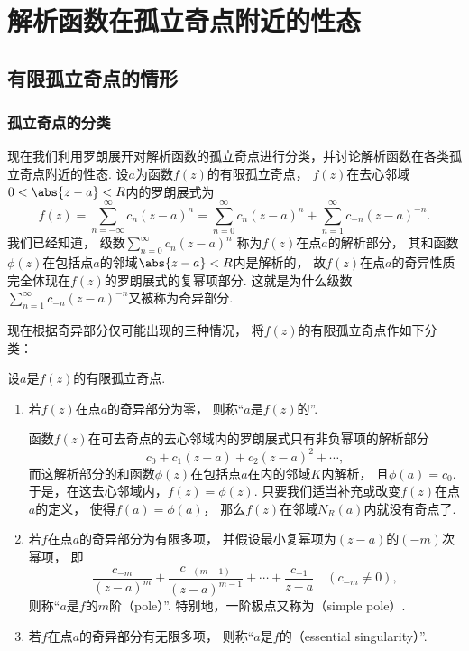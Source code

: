 \section{解析函数在孤立奇点附近的性态}
\subsection{有限孤立奇点的情形}
\subsubsection{孤立奇点的分类}
现在我们利用罗朗展开对解析函数的孤立奇点进行分类，并讨论解析函数在各类孤立奇点附近的性态.
设\(a\)为函数\(f(z)\)的有限孤立奇点，
\(f(z)\)在去心邻域\(0<\abs{z-a}<R\)内的罗朗展式为\[
	f(z) = \sum_{n=-\infty}^\infty c_n (z-a)^n
	= \sum_{n=0}^\infty c_n (z-a)^n
	+ \sum_{n=1}^\infty c_{-n} (z-a)^{-n}.
\]
我们已经知道，
级数\(\sum_{n=0}^\infty c_n (z-a)^n\)
称为\(f(z)\)在点\(a\)的解析部分，
其和函数\(\phi(z)\)在包括点\(a\)的邻域\(\abs{z-a}<R\)内是解析的，
故\(f(z)\)在点\(a\)的奇异性质完全体现在\(f(z)\)的罗朗展式的复幂项部分.
这就是为什么级数\(\sum_{n=1}^\infty c_{-n} (z-a)^{-n}\)又被称为奇异部分.

现在根据奇异部分仅可能出现的三种情况，
将\(f(z)\)的有限孤立奇点作如下分类：
\begin{definition}
设\(a\)是\(f(z)\)的有限孤立奇点.
\begin{enumerate}
	\item 若\(f(z)\)在点\(a\)的奇异部分为零，
	则称“\(a\)是\(f(z)\)的”.

	{\footnotesize
	函数\(f(z)\)在可去奇点的去心邻域内的罗朗展式只有非负幂项的解析部分\[
		c_0 + c_1 (z-a) + c_2 (z-a)^2 + \dotsb,
	\]
	而这解析部分的和函数\(\phi(z)\)在包括点\(a\)在内的邻域\(K\)内解析，
	且\(\phi(a) = c_0\).
	于是，在这去心邻域内，\(f(z) = \phi(z)\).
	只要我们适当补充或改变\(f(z)\)在点\(a\)的定义，
	使得\(f(a) = \phi(a)\)，
	那么\(f(z)\)在邻域\(N_R(a)\)内就没有奇点了.
	}

	\item 若\(f\)在点\(a\)的奇异部分为有限多项，
	并假设最小复幂项为\((z-a)\)的\((-m)\)次幂项，
	即\[
		\frac{c_{-m}}{(z-a)^m} + \frac{c_{-(m-1)}}{(z-a)^{m-1}}
		+ \dotsb + \frac{c_{-1}}{z-a}
		\quad(c_{-m}\neq0),
	\]
	则称“\(a\)是\(f\)的\(m\)阶（pole）”.
	特别地，一阶极点又称为（simple pole）.

	\item 若\(f\)在点\(a\)的奇异部分有无限多项，
	则称“\(a\)是\(f\)的（essential singularity）”.
\end{enumerate}
\end{definition}


